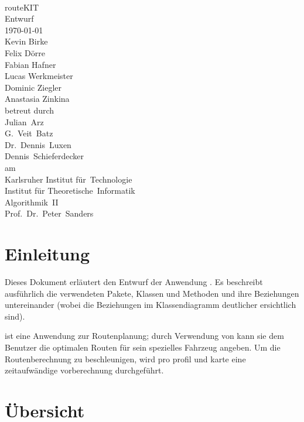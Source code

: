 \documentclass[a4paper, 11pt]{article}
\begin{document}
\begin{titlepage}
\makeatletter
\begin{center}
~\\[5em]
{\Huge routeKIT}\\[3em]
{\huge Entwurf}\\[1em]
{\large\today}\\[2.5em]
{\LARGE
Kevin Birke\\
Felix Dörre\\
Fabian Hafner\\
Lucas Werkmeister\\
Dominic Ziegler\\
Anastasia Zinkina\\[3em]}
betreut durch\\[2em]
{\Large
Julian~Arz\\
G.~Veit~Batz\\
Dr.~Dennis~Luxen\\
Dennis~Schieferdecker\\[1em]}
am\\[1em]
{\Large
Karlsruher Institut für~Technologie\\
Institut für Theoretische~Informatik\\
Algorithmik~II\\
\large
Prof.~Dr.~Peter~Sanders}
\end{center}
\makeatother
\end{titlepage}
\tableofcontents
\newpage


\section{Einleitung}

Dieses Dokument erläutert den Entwurf der Anwendung \routeKIT. %
Es beschreibt ausführlich die verwendeten Pakete, Klassen und Methoden und ihre Beziehungen untereinander (wobei die Beziehungen im Klassendiagramm deutlicher ersichtlich sind).

\routeKIT ist eine Anwendung zur Routenplanung; durch Verwendung von  kann sie dem Benutzer die optimalen Routen für sein spezielles Fahrzeug angeben.
Um die Routenberechnung zu beschleunigen, wird pro \gls{profil} und \gls{karte} eine zeitaufwändige \gls{vorberechnung} durchgeführt.


\section{Übersicht}
\end{document}
